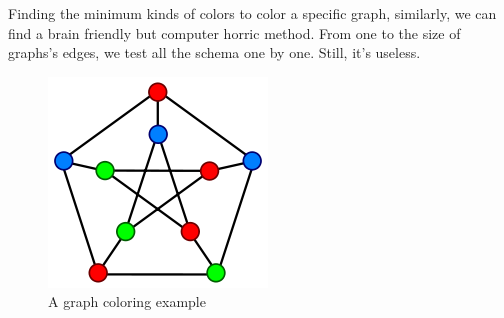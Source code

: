 \documentclass[10pt, a4paper, twocolumn]{article} %
\begin{document}
Finding the minimum kinds of colors to color a specific graph,
similarly, we can find a brain friendly but computer horric method. From one to
the size of  graphs's edges, we test all the schema one by one. Still, it's
useless.

\begin{figure}
	\includegraphics[width=\linewidth]{gcone.png} %
	\caption{A graph coloring example} %
	\label{gcone} %
\end{figure}
\end{document}
